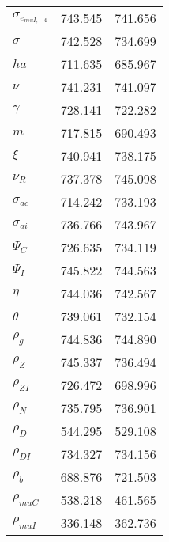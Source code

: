 \begin{center}
\begin{longtable}{lcc}
$ \sigma_{{e_{muI,-4}}}   $	 & 	     743.545	 & 	     741.656 \\ 
$ {\sigma}                $	 & 	     742.528	 & 	     734.699 \\ 
$ {ha}                    $	 & 	     711.635	 & 	     685.967 \\ 
$ \nu                     $	 & 	     741.231	 & 	     741.097 \\ 
$ \gamma                  $	 & 	     728.141	 & 	     722.282 \\ 
$ {m}                     $	 & 	     717.815	 & 	     690.493 \\ 
$ \xi                     $	 & 	     740.941	 & 	     738.175 \\ 
$ {\nu_R}                 $	 & 	     737.378	 & 	     745.098 \\ 
$ {\sigma_{ac}}           $	 & 	     714.242	 & 	     733.193 \\ 
$ {\sigma_{ai}}           $	 & 	     736.766	 & 	     743.967 \\ 
$ {\Psi_C}                $	 & 	     726.635	 & 	     734.119 \\ 
$ {\Psi_I}                $	 & 	     745.822	 & 	     744.563 \\ 
$ {\eta}                  $	 & 	     744.036	 & 	     742.567 \\ 
$ {\theta}                $	 & 	     739.061	 & 	     732.154 \\ 
$ {\rho_g}                $	 & 	     744.836	 & 	     744.890 \\ 
$ {\rho_Z}                $	 & 	     745.337	 & 	     736.494 \\ 
$ {\rho_{ZI}}             $	 & 	     726.472	 & 	     698.996 \\ 
$ {\rho_N}                $	 & 	     735.795	 & 	     736.901 \\ 
$ {\rho_D}                $	 & 	     544.295	 & 	     529.108 \\ 
$ {\rho_{DI}}             $	 & 	     734.327	 & 	     734.156 \\ 
$ {\rho_b}                $	 & 	     688.876	 & 	     721.503 \\ 
$ {\rho_{muC}}            $	 & 	     538.218	 & 	     461.565 \\ 
$ {\rho_{muI}}            $	 & 	     336.148	 & 	     362.736 \\ 
\end{longtable}
 \end{center}
